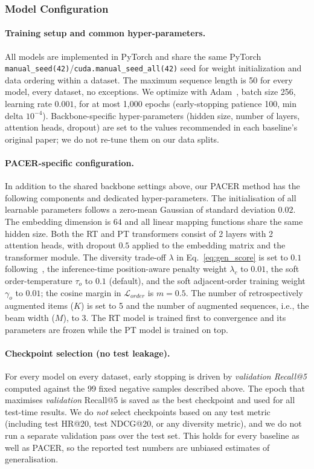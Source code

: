 \subsubsection{Model Configuration}

\paragraph{Training setup and common hyper-parameters.}
All models are implemented in PyTorch and share the same PyTorch \texttt{manual\_seed(42)}/\texttt{cuda.manual\_seed\_all(42)} seed for weight initialization and data ordering within a dataset. The maximum sequence length is 50 for every model, every dataset, no exceptions. We optimize with Adam~\cite{kingma2015}, batch size 256, learning rate $0.001$, for at most 1{,}000 epochs (early-stopping patience 100, min delta $10^{-4}$). Backbone-specific hyper-parameters (hidden size, number of layers, attention heads, dropout) are set to the values recommended in each baseline's original paper; we do not re-tune them on our data splits.

\paragraph{PACER-specific configuration.}
In addition to the shared backbone settings above, our PACER method has the following components and dedicated hyper-parameters. The initialisation of all learnable parameters follows a zero-mean Gaussian of standard deviation $0.02$. The embedding dimension is 64 and all linear mapping functions share the same hidden size. Both the RT and PT transformers consist of 2 layers with 2 attention heads, with dropout $0.5$ applied to the embedding matrix and the transformer module. The diversity trade-off $\lambda$ in Eq.~\eqref{eq:gen_score} is set to $0.1$ following~\cite{shi2024trier}, the inference-time position-aware penalty weight $\lambda_c$ to $0.01$, the soft order-temperature $\tau_o$ to $0.1$ (default), and the soft adjacent-order training weight $\gamma_o$ to $0.01$; the cosine margin in $\mathcal{L}_{order}$ is $m=0.5$. The number of retrospectively augmented items ($K$) is set to 5 and the number of augmented sequences, i.e., the beam width ($M$), to 3. The RT model is trained first to convergence and its parameters are frozen while the PT model is trained on top.

\paragraph{Checkpoint selection (no test leakage).}
For every model on every dataset, early stopping is driven by \emph{validation Recall@5} computed against the 99 fixed negative samples described above. The epoch that maximises \emph{validation} Recall@5 is saved as the best checkpoint and used for all test-time results. We do \emph{not} select checkpoints based on any test metric (including test HR@20, test NDCG@20, or any diversity metric), and we do not run a separate validation pass over the test set. This holds for every baseline as well as PACER, so the reported test numbers are unbiased estimates of generalisation.

